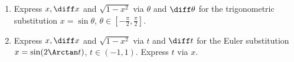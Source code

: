 \begin{enumerate}[ref={\fcProblemRef}]
\item \label{problemTheoreticalTrigSubx=sint} Express $x, \diff x $ and $\sqrt{1-x^2 }$ via $\theta$ and $\diff \theta$ for the trigonometric substitution $x=\sin \theta $, $\theta\in \left[-\frac{\pi}{2}, \frac{\pi}{2}\right]$.
\item \label{problemTheoreticalTrigSubx=sin(2arctant)} Express $x, \diff x $ and $\sqrt{1-x^2}$ via $t$ and $\diff t$ for the Euler substitution $x=\sin(2\Arctan t)$, $t\in(-1,1)$. Express $t$ via $x$.
\end{enumerate}

